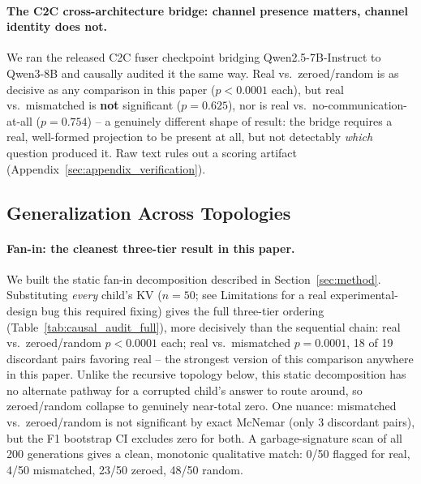\documentclass[11pt]{article}
\begin{document}
\paragraph{The C2C cross-architecture bridge: channel presence matters,
channel identity does not.} We ran the released C2C fuser checkpoint
\citep{c2c2026} bridging Qwen2.5-7B-Instruct to Qwen3-8B and
causally audited it the same way. Real vs.\ zeroed/random is as decisive
as any comparison in this paper ($p<0.0001$ each), but real vs.\
mismatched is \textbf{not} significant ($p=0.625$), nor is real vs.\
no-communication-at-all ($p=0.754$) -- a genuinely different shape of
result: the bridge requires a real, well-formed projection to be present
at all, but not detectably \emph{which} question produced it. Raw text
rules out a scoring artifact (Appendix~\ref{sec:appendix_verification}).

\subsection{Generalization Across Topologies}
\label{sec:topology_generalization}

\paragraph{Fan-in: the cleanest three-tier result in this paper.} We
built the static fan-in decomposition described in
Section~\ref{sec:method}. Substituting \emph{every} child's KV ($n=50$;
see Limitations for a real experimental-design bug this required fixing)
gives the full three-tier ordering (Table~\ref{tab:causal_audit_full}),
more decisively than the sequential chain: real vs.\ zeroed/random
$p<0.0001$ each; real vs.\ mismatched $p=0.0001$, 18 of 19 discordant
pairs favoring real -- the strongest version of this comparison anywhere
in this paper. Unlike the recursive topology below, this static
decomposition has no alternate pathway for a corrupted child's answer to
route around, so zeroed/random collapse to genuinely near-total zero. One
nuance: mismatched vs.\ zeroed/random is not significant by exact
McNemar (only 3 discordant pairs), but the F1 bootstrap CI excludes zero
for both. A garbage-signature scan of all 200 generations gives a clean,
monotonic qualitative match: 0/50 flagged for real, 4/50 mismatched,
23/50 zeroed, 48/50 random.
\end{document}
